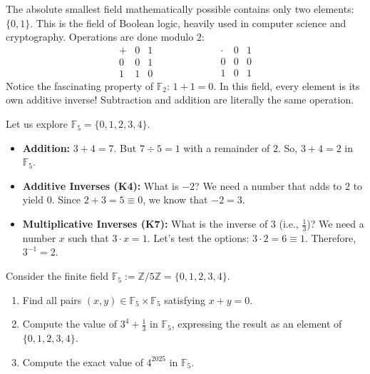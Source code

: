 \begin{example}
The absolute smallest field mathematically possible contains only two elements: $\{0, 1\}$. This is the field of Boolean logic, heavily used in computer science and cryptography. Operations are done modulo $2$:
\[
\begin{array}{c|cc}
+ & 0 & 1 \\
\hline
0 & 0 & 1 \\
1 & 1 & 0
\end{array}
\qquad\qquad\qquad
\begin{array}{c|cc}
\cdot & 0 & 1 \\
\hline
0 & 0 & 0 \\
1 & 0 & 1
\end{array}
\]
Notice the fascinating property of $\mathbb{F}_2$: $1 + 1 = 0$. In this field, every element is its own additive inverse! Subtraction and addition are literally the same operation.
\end{example}

\begin{example}
Let us explore $\mathbb{F}_5 = \{0, 1, 2, 3, 4\}$.
\begin{itemize}
    \item \textbf{Addition:} $3 + 4 = 7$. But $7 \div 5 = 1$ with a remainder of $2$. So, $3 + 4 = 2$ in $\mathbb{F}_5$.
    \item \textbf{Additive Inverses \textbf{(K4)}:} What is $-2$? We need a number that adds to $2$ to yield $0$. Since $2 + 3 = 5 \equiv 0$, we know that $-2 = 3$.
    \item \textbf{Multiplicative Inverses \textbf{(K7)}:} What is the inverse of $3$ (i.e., $\frac{1}{3}$)? We need a number $x$ such that $3 \cdot x = 1$. Let's test the options: $3 \cdot 2 = 6 \equiv 1$. Therefore, $3^{-1} = 2$.
\end{itemize}
\end{example}

\begin{exercise}
\label{exc:finite_field_f5_arithmetic}
Consider the finite field $\mathbb{F}_5 := \mathbb{Z}/5\mathbb{Z} = \{0, 1, 2, 3, 4\}$.
\begin{enumerate}
    \item Find all pairs $(x, y) \in \mathbb{F}_5 \times \mathbb{F}_5$ satisfying $x + y = 0$.
    \item Compute the value of $3^4 + \frac{1}{3}$ in $\mathbb{F}_5$, expressing the result as an element of $\{0, 1, 2, 3, 4\}$.
    \item Compute the exact value of $4^{2025}$ in $\mathbb{F}_5$.
\end{enumerate}
\end{exercise}

